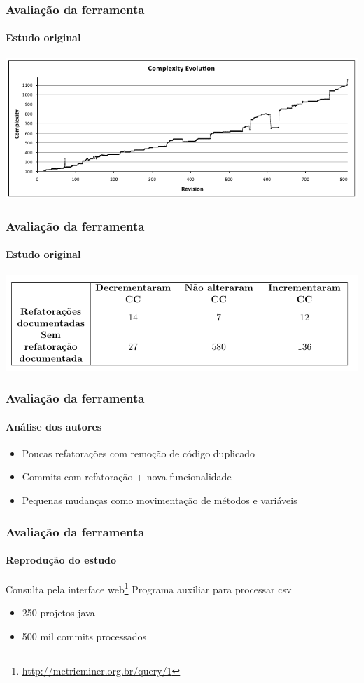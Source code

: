 \documentclass[brazil]{beamer}
\begin{document}
	\begin{frame}
		\frametitle{Avaliação da ferramenta}
		\framesubtitle{Estudo original}
		\includegraphics[width=1.00\textwidth]{img/cc-soetens.png}
	\end{frame}

	\begin{frame}
		\frametitle{Avaliação da ferramenta}
		\framesubtitle{Estudo original}
		\includegraphics[width=1.00\textwidth]{img/tabela-soetens.png}
	\end{frame}

	\begin{frame}
		\frametitle{Avaliação da ferramenta}
		\framesubtitle{Análise dos autores}
		\begin{itemize}
			\item Poucas refatorações com remoção de código duplicado
			\item Commits com refatoração + nova funcionalidade
			\item Pequenas mudanças como movimentação de métodos e variáveis
		\end{itemize}
	\end{frame}

	\begin{frame}
		\frametitle{Avaliação da ferramenta}
		\framesubtitle{Reprodução do estudo}
		Consulta pela interface web\footnote{\url{http://metricminer.org.br/query/1}}
		Programa auxiliar para processar csv
		\begin{itemize}
			\item 250 projetos java
			\item 500 mil commits processados
		\end{itemize}
	\end{frame}
\end{document}
